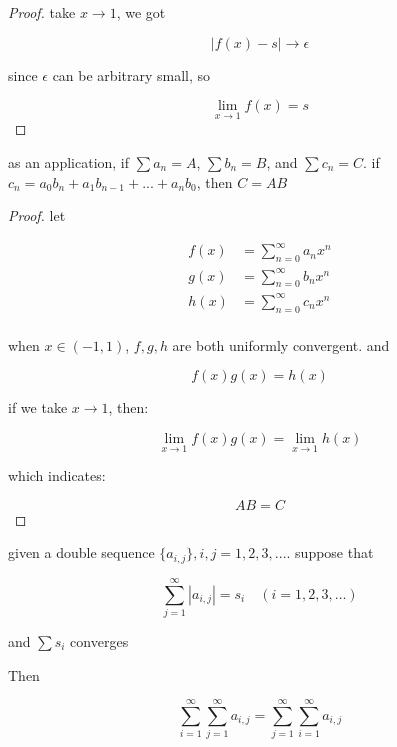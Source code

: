 \begin{proof}
    take $x \to 1$, we got

    \[
        \left| f(x) -s \right| \to \epsilon
    \]

    since $\epsilon$ can be arbitrary small, so 

    \[
        \lim_{x \to 1}f(x) = s
    \]

\end{proof}

\begin{thm}
    as an application, if $\sum a_n = A$, $\sum b_n =B$, and $\sum c_n = C$.
    if $c_n = a_0b_n + a_1b_{n-1}  + ... + a_nb_0$, then $C = AB$       
\end{thm}

\begin{proof}
    let 

    \begin{align*}
        f(x) &= \sum_{n=0}^{\infty} a_n x^n \\
        g(x) &= \sum_{n=0}^{\infty} b_n x^n \\
        h(x) &= \sum_{n=0}^{\infty} c_n x^n \\
    \end{align*}

    when $x \in (-1,1)$, $f,g,h$ are both uniformly convergent.
    and

    \[
        f(x)g(x) = h(x)
    \]

    if we take $x \to 1$, then:

    \[
        \lim_{x \to 1}f(x)g(x) = \lim_{x \to 1}h(x)
    \]

    which indicates:

    \[
        A B = C
    \]
\end{proof}

\begin{thm}
    given a double sequence $\{ a_{i,j} \}, i,j = 1,2,3,...$.
    suppose that

    \[
        \sum_{j=1}^{\infty}|a_{i,j}| = s_i \quad (i=1,2,3,...)
    \]

    and $\sum s_i$ converges

    Then

    \[
        \sum_{i=1}^{\infty}\sum_{j=1}^{\infty}a_{i,j} = \sum_{j=1}^{\infty}\sum_{i=1}^{\infty}a_{i,j}
    \]
\end{thm}

